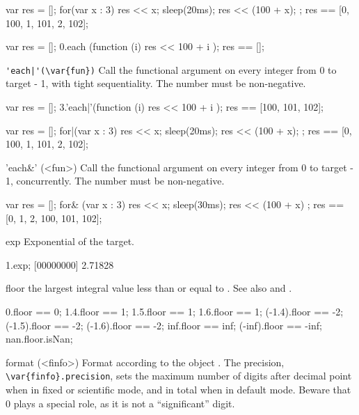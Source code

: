 \begin{urbiscriptapi}
\begin{urbiassert}
{
  var res = [];
  for(var x : 3) { res << x; sleep(20ms); res << (100 + x); };
  res
}
== [0, 100, 1, 101, 2, 102];

{
  var res = [];
  0.each (function (i) { res << 100 + i });
  res
}
== [];
\end{urbiassert}

\item \lstinline+'each|'(\var{fun})+%
  Call the functional argument  on every integer from 0 to
  target - 1, with tight sequentiality.  The number must be
  non-negative.
\begin{urbiassert}
{
  var res = [];
  3.'each|'(function (i) { res << 100 + i });
  res
}
== [100, 101, 102];

{
  var res = [];
  for|(var x : 3) { res << x; sleep(20ms); res << (100 + x); };
  res
}
== [0, 100, 1, 101, 2, 102];
\end{urbiassert}%

\item['each&'](<fun>)%
  Call the functional argument  on every integer from 0 to
  target - 1, concurrently.  The number must be non-negative.
\begin{urbiassert}
{
  var res = [];
  for& (var x : 3) { res << x; sleep(30ms); res << (100 + x) };
  res
}
== [0, 1, 2, 100, 101, 102];
\end{urbiassert}%

\item[exp]
  Exponential of the target.
\begin{urbiscript}
1.exp;
[00000000] 2.71828
\end{urbiscript}


\item[floor] the largest integral value less than or equal to \this.  See
  also  and .
\begin{urbiassert}
     0.floor ==  0;
   1.4.floor ==  1;     1.5.floor ==  1;    1.6.floor ==  1;
(-1.4).floor == -2;  (-1.5).floor == -2; (-1.6).floor == -2;
   inf.floor == inf; (-inf).floor == -inf;
   nan.floor.isNan;
\end{urbiassert}


\item[format](<finfo>)%
  Format according to the  object .
  The precision, \lstinline|\var{finfo}.precision|, sets the maximum
  number of digits after decimal point when in fixed or scientific
  mode, and in total when in default mode.  Beware that 0 plays a
  special role, as it is not a ``significant'' digit.


\end{urbiscriptapi}
